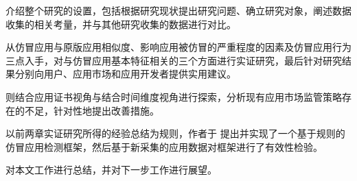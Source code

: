  介绍整个研究的设置，包括根据研究现状提出研究问题、确立研究对象，阐述数据收集的相关考量，并与其他研究收集的数据进行对比。

 从仿冒应用与原版应用相似度、影响应用被仿冒的严重程度的因素及仿冒应用行为三点入手，对与仿冒应用基本特征相关的三个方面进行实证研究，最后针对研究结果分别向用户、应用市场和应用开发者提供实用建议。

 则结合应用证书视角与结合时间维度视角进行探索，分析现有应用市场监管策略存在的不足，针对性地提出改善措施。

以前两章实证研究所得的经验总结为规则，作者于 提出并实现了一个基于规则的仿冒应用检测框架，然后基于新采集的应用数据对框架进行了有效性检验。



 对本文工作进行总结，并对下一步工作进行展望。
